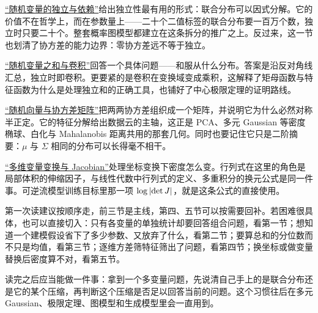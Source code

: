 \hyperref[sec:05-Probability/05-Joint-Distributions/02]{``随机变量的独立与依赖''}给出独立性最有用的形式：联合分布可以因式分解。它的价值不在哲学上，而在参数量上——二十个二值标签的联合分布要一百万个数，独立时只要二十个。整套概率图模型都建立在这条拆分的推广之上。反过来，这一节也划清了协方差的能力边界：零协方差远不等于独立。

\hyperref[sec:05-Probability/05-Joint-Distributions/03]{``随机变量之和与卷积''}回答一个具体问题——和服从什么分布。答案是沿反对角线汇总，独立时即卷积。更要紧的是卷积在变换域变成乘积，这解释了矩母函数与特征函数为什么是处理独立和的正确工具，也铺好了中心极限定理的证明路线。

\hyperref[sec:05-Probability/05-Joint-Distributions/04]{``随机向量与协方差矩阵''}把两两协方差组织成一个矩阵，并说明它为什么必然对称半正定。它的特征分解给出数据云的主轴，这正是 PCA、多元 Gaussian 等密度椭球、白化与 Mahalanobis 距离共用的那套几何。同时也要记住它只是二阶摘要：\(\mu\) 与 \(\Sigma\) 相同的分布可以长得毫不相干。

\hyperref[sec:05-Probability/05-Joint-Distributions/05]{``多维变量变换与 Jacobian''}处理坐标变换下密度怎么变。行列式在这里的角色是局部体积的伸缩因子，与线性代数中行列式的定义、多重积分的换元公式是同一件事。可逆流模型训练目标里那一项 \(\log\left|\det J\right|\)，就是这条公式的直接使用。

第一次读建议按顺序走，前三节是主线，第四、五节可以按需要回补。若困难很具体，也可以直接切入：只有各变量的单独统计却要回答组合问题，看第一节；想知道一个建模假设省下了多少参数、又放弃了什么，看第二节；要算总和的分位数而不只是均值，看第三节；逐维方差筛特征筛出了问题，看第四节；换坐标或做变量替换后密度算不对，看第五节。

读完之后应当能做一件事：拿到一个多变量问题，先说清自己手上的是联合分布还是它的某个压缩，再判断这个压缩是否足以回答当前的问题。这个习惯往后在多元 Gaussian、极限定理、图模型和生成模型里会一直用到。
